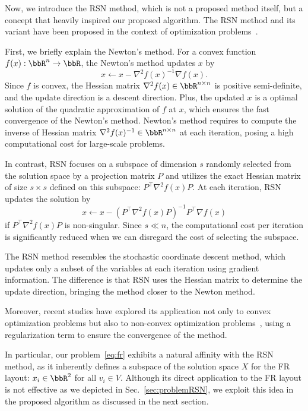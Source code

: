 \documentclass[dvipdfmx,lettersize,journal]{IEEEtran}
\begin{document}
Now, we introduce the RSN method, which is not a proposed method itself, but a concept that heavily inspired our proposed algorithm.
The RSN method and its variant have been proposed in the context of optimization problems~\cite{NEURIPS2019_bc6dc48b,fujiRandomizedSubspaceRegularized2022,cartisRandomisedSubspaceMethods2022,higuchiFastConvergenceSecondOrder2024}.

First, we briefly explain the Newton's method.
For a convex function $f(x): \bbR^n \to \bbR$, the Newton's method updates $x$ by
\begin{equation*}
  x \gets x - \nabla^2 f(x)^{-1} \nabla f(x).
\end{equation*}
Since $f$ is convex, the Hessian matrix $\nabla^2 f(x) \in \bbR^{n \times n}$ is positive semi-definite, and the update direction is a descent direction. Plus, the updated $x$ is a optimal solution of the quadratic approximation of $f$ at $x$, which ensures the fast convergence of the Newton's method.
Newton's method requires to compute the inverse of Hessian matrix $\nabla^2 f(x)^{-1} \in \bbR^{n \times n}$ at each iteration, posing a high computational cost for large-scale problems.

In contrast, RSN focuses on a subspace of dimension $s$ randomly selected from the solution space by a projection matrix $P$ and utilizes the exact Hessian matrix of size $s \times s$ defined on this subspace: $P^\top \nabla^2 f(x) P$.
At each iteration, RSN updates the solution by
\begin{equation*}
  x \gets x - (P^\top \nabla^2 f(x) P)^{-1} P^\top \nabla f(x)
\end{equation*}
if $P^\top \nabla^2 f(x) P$ is non-singular.
Since $s \ll n$, the computational cost per iteration is significantly reduced when we can disregard the cost of selecting the subspace.

The RSN method resembles the stochastic coordinate descent method, which updates only a subset of the variables at each iteration using gradient information.
The difference is that RSN uses the Hessian matrix to determine the update direction, bringing the method closer to the Newton method.

Moreover, recent studies have explored its application not only to convex optimization problems but also to non-convex optimization problems~\cite{fujiRandomizedSubspaceRegularized2022}, using a regularization term to ensure the convergence of the method.

In particular, our problem~\eqref{eq:fr} exhibits a natural affinity with the RSN method, as it inherently defines a subspace of the solution space $X$ for the FR layout: $x_i \in \bbR^2$ for all $v_i \in V$.
Although its direct application to the FR layout is not effective as we depicted in Sec.~\ref{sec:problemRSN}, we exploit this idea in the proposed algorithm as discussed in the next section.
\end{document}
